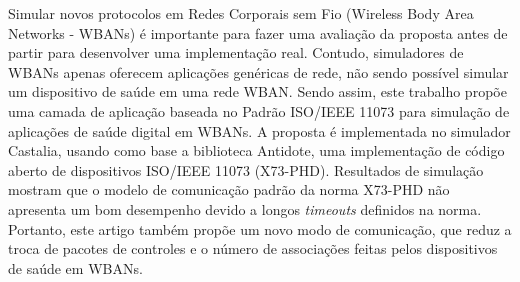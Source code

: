 \documentclass[12pt]{article}
\begin{document}
\begin{resumo}
Simular novos protocolos em Redes Corporais sem Fio (Wireless Body Area Networks - WBANs) é importante para fazer uma avaliação da proposta antes de partir para desenvolver uma implementação real. Contudo, simuladores de WBANs apenas oferecem aplicações genéricas de rede, não sendo possível simular um dispositivo de saúde em uma rede WBAN. Sendo assim, este trabalho propõe uma camada de aplicação baseada no Padrão ISO/IEEE 11073 para simulação de aplicações de saúde digital em WBANs. A proposta é implementada no simulador Castalia, usando como base a biblioteca Antidote, uma implementação de código aberto de dispositivos ISO/IEEE 11073 (X73-PHD).
Resultados de simulação mostram que o modelo de comunicação padrão da norma X73-PHD não apresenta um bom desempenho devido a longos \textit{timeouts} definidos na norma. Portanto, este artigo também propõe um novo modo de comunicação, que reduz a troca de pacotes de controles e o número de associações feitas pelos dispositivos de saúde em WBANs.
\end{resumo}




%








\end{document}
